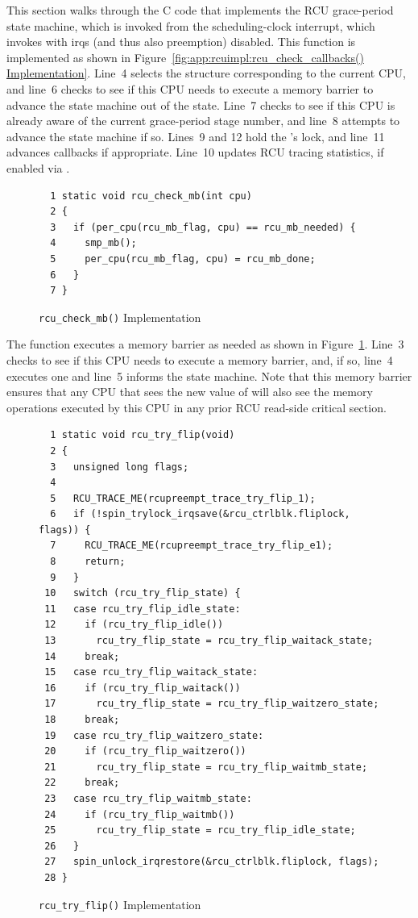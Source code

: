 This section walks through the C code that implements the RCU
grace-period state machine, which is invoked from the scheduling-clock
interrupt, which invokes  with
irqs (and thus also preemption) disabled.
This function is implemented as shown in
Figure~\ref{fig:app:rcuimpl:rcu_check_callbacks() Implementation}.
Line~4 selects the  structure corresponding
to the current CPU, and line~6 checks to see if this CPU needs
to execute a memory barrier to advance the state machine out of the
 state.
Line~7 checks to see if this CPU is already aware of the
current grace-period stage number, and line~8 attempts to advance the
state machine if so.
Lines~9 and 12 hold the 's lock, and
line~11 advances callbacks if appropriate.
Line~10 updates RCU tracing statistics, if enabled via
.

\begin{figure}[tbp]
{ \scriptsize
\begin{verbatim}
  1 static void rcu_check_mb(int cpu)
  2 {
  3   if (per_cpu(rcu_mb_flag, cpu) == rcu_mb_needed) {
  4     smp_mb();
  5     per_cpu(rcu_mb_flag, cpu) = rcu_mb_done;
  6   }
  7 }
\end{verbatim}
}
\caption{{\tt rcu\_check\_mb()} Implementation}
\label{fig:app:rcuimpl:rcu_check_mb() Implementation}
\end{figure}

The  function executes a memory barrier
as needed as shown in
Figure~\ref{fig:app:rcuimpl:rcu_check_mb() Implementation}.
Line~3 checks to see if this CPU needs to execute a memory barrier,
and, if so, line~4 executes one and line~5 informs the state
machine.
Note that this memory barrier ensures that any CPU that sees the new
value of  will also see the memory operations
executed by this CPU in any prior RCU read-side critical section.

\begin{figure}[tbp]
{ \scriptsize
\begin{verbatim}
  1 static void rcu_try_flip(void)
  2 {
  3   unsigned long flags;
  4
  5   RCU_TRACE_ME(rcupreempt_trace_try_flip_1);
  6   if (!spin_trylock_irqsave(&rcu_ctrlblk.fliplock, flags)) {
  7     RCU_TRACE_ME(rcupreempt_trace_try_flip_e1);
  8     return;
  9   }
 10   switch (rcu_try_flip_state) {
 11   case rcu_try_flip_idle_state:
 12     if (rcu_try_flip_idle())
 13       rcu_try_flip_state = rcu_try_flip_waitack_state;
 14     break;
 15   case rcu_try_flip_waitack_state:
 16     if (rcu_try_flip_waitack())
 17       rcu_try_flip_state = rcu_try_flip_waitzero_state;
 18     break;
 19   case rcu_try_flip_waitzero_state:
 20     if (rcu_try_flip_waitzero())
 21       rcu_try_flip_state = rcu_try_flip_waitmb_state;
 22     break;
 23   case rcu_try_flip_waitmb_state:
 24     if (rcu_try_flip_waitmb())
 25       rcu_try_flip_state = rcu_try_flip_idle_state;
 26   }
 27   spin_unlock_irqrestore(&rcu_ctrlblk.fliplock, flags);
 28 }
\end{verbatim}
}
\caption{{\tt rcu\_try\_flip()} Implementation}
\label{fig:app:rcuimpl:rcu_try_flip() Implementation}
\end{figure}


